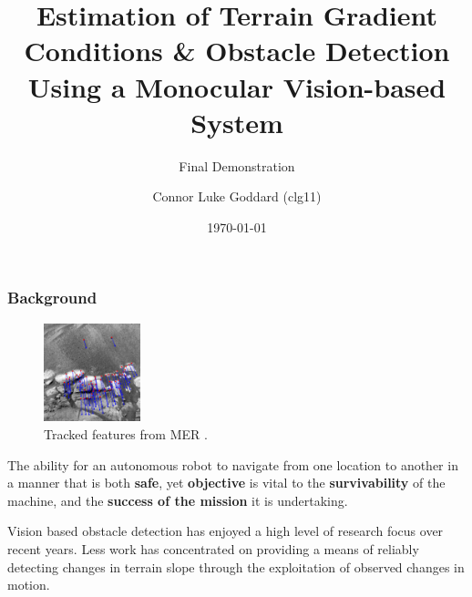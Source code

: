 \documentclass[10pt, compress]{beamer}
\title{Estimation of Terrain Gradient Conditions \& Obstacle Detection Using a Monocular Vision-based System}
\subtitle{Final Demonstration}
\date{\today}
\author{Connor Luke Goddard (clg11)}
\institute{Department of Computer Science, Aberystwyth University}
\begin{document}
\maketitle


\begin{frame}[fragile]
  \frametitle{Background}
  
  \vspace{-10pt}
	
     \begin{block}{}  

	          \begin{figure}
   \vspace{-20pt}
  \begin{center}
    \includegraphics[width=0.25\textwidth]{mars.jpg}
  \end{center}
  \vspace{-15pt}  \caption{\small Tracked features from MER \cite{mars}.}
  \end{figure}
  
  The ability for an autonomous robot to navigate from one location to another in a manner that is both \textbf{safe}, yet \textbf{objective} is vital to the \textbf{survivability} of the machine, and the \textbf{success of the mission} it is undertaking.    
		
       \end{block}

\vspace{15pt}
	
   \begin{block}{}
Vision based obstacle detection has enjoyed a high level of research focus over recent years. Less work has concentrated on providing a means of reliably detecting changes in terrain slope through the exploitation of observed changes in motion. 
  \end{block}


\end{frame}
\end{document}
